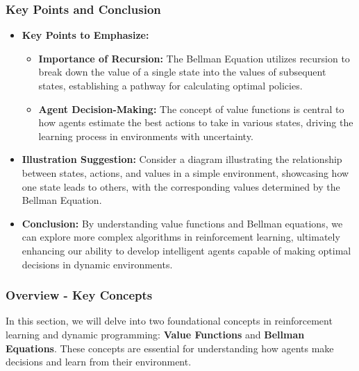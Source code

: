 \documentclass{beamer}
\begin{document}
\begin{frame}[fragile]
    \frametitle{Key Points and Conclusion}

    \begin{itemize}
        \item \textbf{Key Points to Emphasize:}
        \begin{itemize}
            \item \textbf{Importance of Recursion:} 
            The Bellman Equation utilizes recursion to break down the value of a single state into the values of subsequent states, establishing a pathway for calculating optimal policies.
            
            \item \textbf{Agent Decision-Making:} 
            The concept of value functions is central to how agents estimate the best actions to take in various states, driving the learning process in environments with uncertainty.
        \end{itemize}
        
        \item \textbf{Illustration Suggestion:} 
        Consider a diagram illustrating the relationship between states, actions, and values in a simple environment, showcasing how one state leads to others, with the corresponding values determined by the Bellman Equation.
        
        \item \textbf{Conclusion:} 
        By understanding value functions and Bellman equations, we can explore more complex algorithms in reinforcement learning, ultimately enhancing our ability to develop intelligent agents capable of making optimal decisions in dynamic environments.
    \end{itemize}
\end{frame}

\begin{frame}[fragile]
    \frametitle{Overview - Key Concepts}
    In this section, we will delve into two foundational concepts in reinforcement learning and dynamic programming: 
    \textbf{Value Functions} and \textbf{Bellman Equations}. These concepts are essential for understanding how agents make decisions and learn from their environment.
\end{frame}
\end{document}
